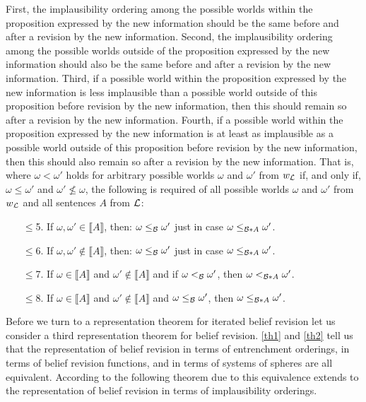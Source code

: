 First, the implausibility ordering among the possible worlds within the proposition expressed by the new information should be the same before and after a revision by the new information. Second, the implausibility ordering among the possible worlds outside of the proposition expressed by the new information should also be the same before and after a revision by the new information. Third, if a possible world within the proposition expressed by the new information is less implausible than a possible world outside of this proposition before revision by the new information, then this should remain so after a revision by the new information. Fourth, if a possible world within the proposition expressed by the new information is at least as implausible as a possible world outside of this proposition before revision by the new information, then this should also remain so after a revision by the new information. That is, where $\omega<\omega'$ holds for arbitrary possible worlds $\omega$ and $\omega'$ from $w_{\cal L}$ if, and only if, $\omega\leq\omega'$ and $\omega'\not\leq\omega$, the following is required of all possible worlds $\omega$ and $\omega'$ from $w_{\cal L}$ and all sentences $A$ from $\cal L$:
\begin{enumerate}
\item[$\leq$5.] If $\omega,\omega'\in\llbracket A\rrbracket$, then: $\omega\leq_{\cal B}\omega'$ just in case $\omega\leq_{\begin{cal}B\end{cal}*A}\omega'$.
\item[$\leq$6.] If $\omega,\omega'\not\in\llbracket A\rrbracket$, then: $\omega\leq_{\cal B}\omega'$ just in case $\omega\leq_{\begin{cal}B\end{cal}*A}\omega'$.
\item[$\leq$7.] If $\omega\in\llbracket A\rrbracket$ and $\omega'\not\in\llbracket A\rrbracket$ and if $\omega<_{\cal B}\omega'$, then $\omega<_{\begin{cal}B\end{cal}*A}\omega'$.
\item[$\leq$8.] If $\omega\in\llbracket A\rrbracket$ and $\omega'\not\in\llbracket A\rrbracket$ and $\omega\leq_{\cal B}\omega'$, then $\omega\leq_{\begin{cal}B\end{cal}*A}\omega'$.
\end{enumerate}
Before we turn to a representation theorem for iterated belief revision let us consider a third representation theorem for belief revision. \autoref{th1} and \autoref{th2} tell us that the representation of belief revision in terms of entrenchment orderings, in terms of belief revision functions, and in terms of systems of spheres are all equivalent. According to the following theorem due to \citet{g88} this equivalence extends to the representation of belief revision in terms of implausibility orderings.
